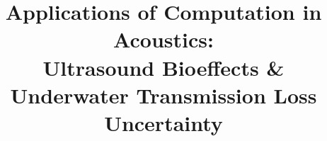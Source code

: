 


\title[]{Applications of Computation in Acoustics:\\Ultrasound Bioeffects \&\\ Underwater Transmission Loss Uncertainty}
\author[] {}

\institute[]{}
\date[date]{}


